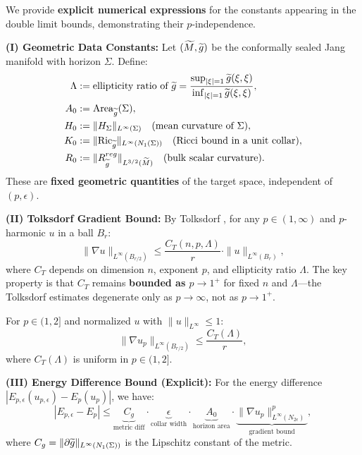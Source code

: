 \begin{remark}\label{rem:ExplicitPUniform}
We provide \textbf{explicit numerical expressions} for the constants appearing in the double limit bounds, demonstrating their $p$-independence.

\textbf{(I) Geometric Data Constants:}
Let $(\widetilde{M}, \widetilde{g})$ be the conformally sealed Jang manifold with horizon $\Sigma$. Define:
\begin{align}
    \Lambda &:= \text{ellipticity ratio of } \widetilde{g} = \frac{\sup_{|\xi|=1} \widetilde{g}(\xi,\xi)}{\inf_{|\xi|=1} \widetilde{g}(\xi,\xi)}, \\
    A_0 &:= \operatorname{Area}_{\widetilde{g}}(\Sigma), \\
    H_0 &:= \|H_\Sigma\|_{L^\infty(\Sigma)} \quad \text{(mean curvature of } \Sigma \text{)}, \\
    K_0 &:= \|\mathrm{Ric}_{\widetilde{g}}\|_{L^\infty(N_1(\Sigma))} \quad \text{(Ricci bound in a unit collar)}, \\
    R_0 &:= \|R_{\widetilde{g}}^{reg}\|_{L^{3/2}(\widetilde{M})} \quad \text{(bulk scalar curvature)}.
\end{align}
These are \textbf{fixed geometric quantities} of the target space, independent of $(p, \epsilon)$.

\textbf{(II) Tolksdorf Gradient Bound:}
By Tolksdorf \cite{tolksdorf1984}, for any $p \in (1, \infty)$ and $p$-harmonic $u$ in a ball $B_r$:
\begin{equation}\label{eq:TolksdorfExplicit}
    \|\nabla u\|_{L^\infty(B_{r/2})} \le \frac{C_T(n, p, \Lambda)}{r} \cdot \|u\|_{L^\infty(B_r)},
\end{equation}
where $C_T$ depends on dimension $n$, exponent $p$, and ellipticity ratio $\Lambda$. The key property is that $C_T$ remains \textbf{bounded as $p \to 1^+$} for fixed $n$ and $\Lambda$---the Tolksdorf estimates degenerate only as $p \to \infty$, not as $p \to 1^+$.

For $p \in (1, 2]$ and normalized $u$ with $\|u\|_{L^\infty} \le 1$:
\begin{equation}
    \|\nabla u_p\|_{L^\infty(B_{r/2})} \le \frac{C_T(\Lambda)}{r},
\end{equation}
where $C_T(\Lambda)$ is uniform in $p \in (1, 2]$.

\textbf{(III) Energy Difference Bound (Explicit):}
For the energy difference $|E_{p,\epsilon}(u_{p,\epsilon}) - E_p(u_p)|$, we have:
\begin{equation}\label{eq:EnergyDiffExplicit}
    |E_{p,\epsilon} - E_p| \le \underbrace{C_g}_{\text{metric diff}} \cdot \underbrace{\epsilon}_{\text{collar width}} \cdot \underbrace{A_0}_{\text{horizon area}} \cdot \underbrace{\|\nabla u_p\|_{L^\infty(N_{2\epsilon})}^p}_{\text{gradient bound}},
\end{equation}
where $C_g = \|\partial \widetilde{g}\|_{L^\infty(N_1(\Sigma))}$ is the Lipschitz constant of the metric.


\end{remark}
